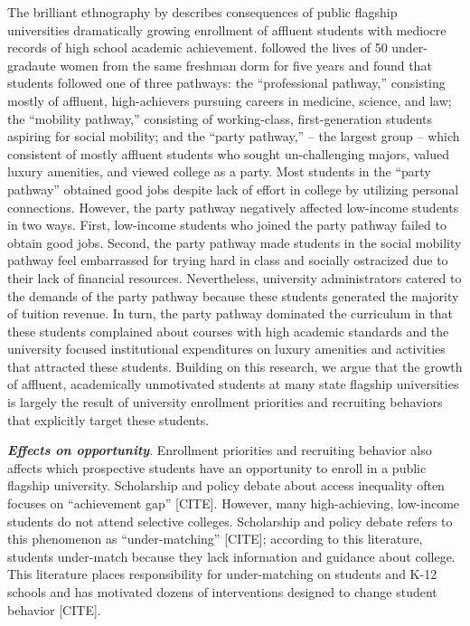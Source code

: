 \documentclass[twoside]{article}
\begin{document}
The brilliant ethnography by \cite{RN4231} describes consequences of public flagship universities dramatically growing enrollment of affluent students with mediocre records of high school academic achievement. \cite{RN4231} followed the lives of 50 under-gradaute women from the same freshman dorm for five years and found that students followed one of three pathways: the ``professional pathway,'' consisting mostly of affluent, high-achievers pursuing careers in medicine, science, and law; the ``mobility pathway,'' consisting of working-class, first-generation students aspiring for social mobility; and the ``party pathway,'' -- the largest group -- which consistent of mostly affluent students who sought un-challenging majors, valued luxury amenities, and viewed college as a party. Most students in the ``party pathway'' obtained good jobs despite lack of effort in college by utilizing personal connections. However, the party pathway negatively affected low-income students in two ways. First, low-income students who joined the party pathway failed to obtain good jobs. Second, the party pathway made students in the social mobility pathway feel embarrassed for trying hard in class and socially ostracized due to their lack of financial resources.  Nevertheless, university administrators catered to the demands of the party pathway because these students generated the majority of tuition revenue. In turn, the party pathway dominated the curriculum in that these students complained about courses with high academic standards and the university focused institutional expenditures on luxury amenities and activities that attracted these students. Building on this research, we argue that the growth of affluent, academically unmotivated students at many state flagship universities is largely the result of university enrollment priorities and recruiting behaviors that explicitly target these students.

\textbf{\textit{Effects on opportunity}}.  Enrollment priorities and recruiting behavior also affects which prospective students have an opportunity to enroll in a public flagship university.  Scholarship and policy debate about access inequality often focuses on ``achievement gap'' [CITE].  However, many high-achieving, low-income students do not attend selective colleges.  Scholarship and policy debate refers to this phenomenon as “under-matching” [CITE]; according to this literature, students under-match because they lack information and guidance about college. This literature places responsibility for under-matching on students and K-12 schools and has motivated dozens of interventions designed to change student behavior [CITE].
\end{document}
